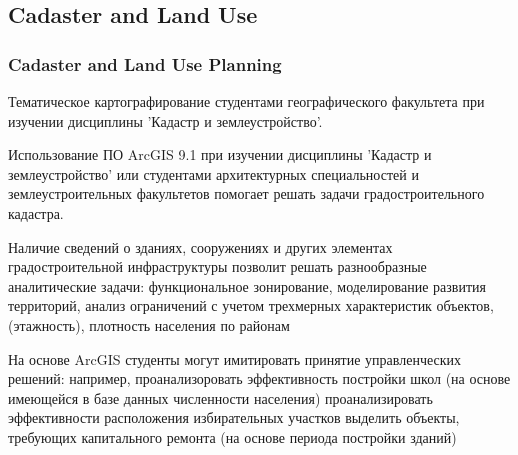 \documentclass[pdflatex,compress,8pt,
	xcolor={dvipsnames,dvipsnames,svgnames,x11names,table},
	hyperref={	 
	pdfauthor={Lemenkova Polina}, 
	pdfsubject={Preentation}, 
	pdfcreator={Lemenkova Polina}, 
	pdfproducer={Lemenkova Polina}, 
	colorlinks=true,
	linkcolor=Red3, 
	citecolor=NavyBlue, 
	urlcolor = NavyBlue, 
	breaklinks = true}]{beamer}
\begin{document}
\subsection{Cadaster and Land Use}
\begin{frame}\frametitle{Cadaster and Land Use Planning}

\begin{alertblock}{}
Тематическое картографирование студентами географического факультета при изучении  дисциплины 'Кадастр и землеустройство'.
\end{alertblock}

\begin{block}{}
Использование ПО ArcGIS 9.1 при изучении  дисциплины 'Кадастр и землеустройство' или студентами архитектурных специальностей и землеустроительных факультетов помогает решать задачи градостроительного кадастра.
\end{block}

\begin{alertblock}{}
Наличие сведений о зданиях, сооружениях и других элементах градостроительной инфраструктуры позволит решать разнообразные аналитические задачи: функциональное зонирование, моделирование развития территорий, анализ ограничений с учетом трехмерных характеристик объектов, (этажность), плотность населения по районам
\end{alertblock}

\begin{block}{}
На основе ArcGIS студенты могут имитировать принятие управленческих решений:
например, проанализоровать эффективность постройки школ (на основе имеющейся в базе данных численности населения) проанализировать эффективности расположения избирательных участков выделить объекты, требующих капитального ремонта (на основе периода постройки зданий) 
\end{block}

\end{frame}
\end{document}
